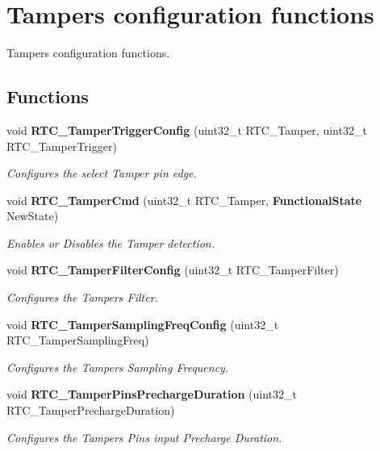 \section{Tampers configuration functions}
\label{group__RTC__Group9}


Tampers configuration functions.  


\subsection*{Functions}
\begin{DoxyCompactItemize}
\item 
void \textbf{ R\+T\+C\+\_\+\+Tamper\+Trigger\+Config} (uint32\+\_\+t R\+T\+C\+\_\+\+Tamper, uint32\+\_\+t R\+T\+C\+\_\+\+Tamper\+Trigger)
\begin{DoxyCompactList}\small\item\em Configures the select Tamper pin edge. \end{DoxyCompactList}\item 
void \textbf{ R\+T\+C\+\_\+\+Tamper\+Cmd} (uint32\+\_\+t R\+T\+C\+\_\+\+Tamper, \textbf{ Functional\+State} New\+State)
\begin{DoxyCompactList}\small\item\em Enables or Disables the Tamper detection. \end{DoxyCompactList}\item 
void \textbf{ R\+T\+C\+\_\+\+Tamper\+Filter\+Config} (uint32\+\_\+t R\+T\+C\+\_\+\+Tamper\+Filter)
\begin{DoxyCompactList}\small\item\em Configures the Tampers Filter. \end{DoxyCompactList}\item 
void \textbf{ R\+T\+C\+\_\+\+Tamper\+Sampling\+Freq\+Config} (uint32\+\_\+t R\+T\+C\+\_\+\+Tamper\+Sampling\+Freq)
\begin{DoxyCompactList}\small\item\em Configures the Tampers Sampling Frequency. \end{DoxyCompactList}\item 
void \textbf{ R\+T\+C\+\_\+\+Tamper\+Pins\+Precharge\+Duration} (uint32\+\_\+t R\+T\+C\+\_\+\+Tamper\+Precharge\+Duration)
\begin{DoxyCompactList}\small\item\em Configures the Tampers Pins input Precharge Duration. \end{DoxyCompactList}\item 

\end{DoxyCompactItemize}
